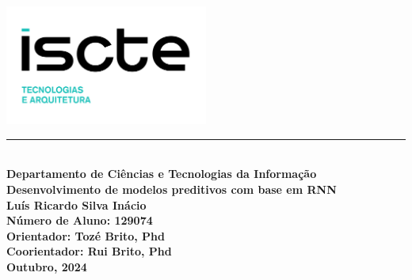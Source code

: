 \begin{titlepage}
	\begin{flushleft}
		\includegraphics[width=0.5\textwidth]{ista.png}\\[1cm]
	\end{flushleft}
	\noindent
	\textcolor{barraazul}{\rule{\textwidth}{1mm}} %
	\\[0.5cm]
	{\Large \textbf{\centering Departamento de Ciências e Tecnologias da Informação}}\\[1cm]
	{\Huge \textbf{\centering Desenvolvimento de modelos preditivos com base em RNN}}\\[1.5cm]
	\noindent
	\textbf{Luís Ricardo Silva Inácio}\\
	\textbf{Número de Aluno: 129074}\\[2cm]
	\textbf{Orientador: Tozé Brito, Phd}\\
	\textbf{Coorientador: Rui Brito, Phd}\\[3cm]
	\textbf{Outubro, 2024}
\end{titlepage}
